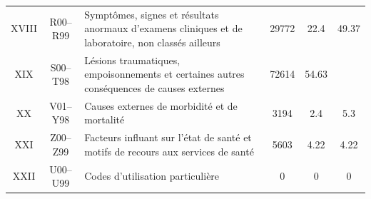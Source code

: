 \documentclass[12pt,english,french,twoside]{report}\usepackage[]{graphicx}\usepackage[]{color}
\begin{document}
\begin{longtable}{|c|c|m{4cm}|c|c|c|}

XVIII&R00–R99&Symptômes, signes et résultats anormaux d'examens cliniques et de laboratoire, non classés ailleurs&29772&22.4&49.37\\

XIX&S00–T98&Lésions traumatiques, empoisonnements et certaines autres conséquences de causes externes&72614&54.63& \\

XX&V01–Y98&Causes externes de morbidité et de mortalité& 3194&2.4&5.3\\

XXI&Z00–Z99&Facteurs influant sur l'état de santé et motifs de recours aux services de santé&5603&4.22&4.22\\

XXII&U00–U99&Codes d'utilisation particulière & 0&0&0\\

  \hline
\end{longtable}
\end{document}
